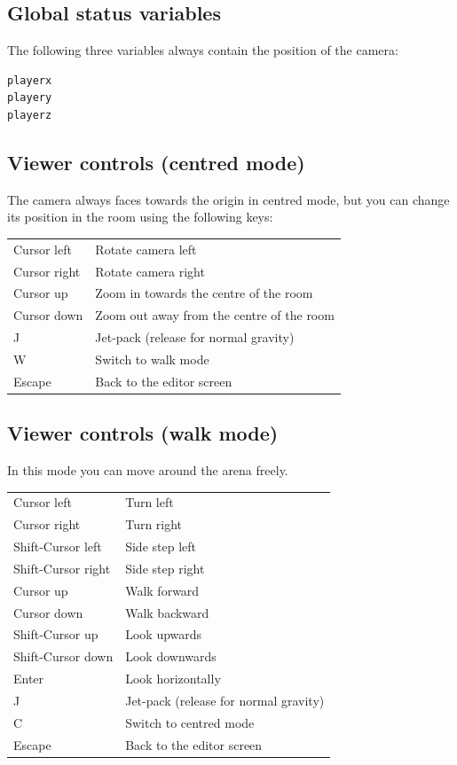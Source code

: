 \documentclass[12pt,a4paper,twoside]{article}
\renewcommand{\_}{\texttt{\symbol{95}}}
\begin{document}

\subsection{Global status variables}

The following three variables always contain the position of the camera:

\begin{verbatim}
playerx
playery
playerz
\end{verbatim}

\subsection{Viewer controls (centred mode)}

The camera always faces towards the origin in centred mode,
but you can change its position in the room using the following keys:

\begin{tabular}{ll}
Cursor left  & Rotate camera left\\
Cursor right & Rotate camera right\\
Cursor up    & Zoom in towards the centre of the room\\
Cursor down  & Zoom out away from the centre of the room\\
J            & Jet-pack (release for normal gravity)\\
W            & Switch to walk mode\\
Escape       & Back to the editor screen\\
\end{tabular}

\subsection{Viewer controls (walk mode)}

In this mode you can move around the arena freely.

\begin{tabular}{ll}
Cursor left  & Turn left\\
Cursor right & Turn right\\
Shift-Cursor left  & Side step left\\
Shift-Cursor right & Side step right\\
Cursor up    & Walk forward\\
Cursor down  & Walk backward\\
Shift-Cursor up & Look upwards\\
Shift-Cursor down & Look downwards\\
Enter        & Look horizontally\\
J            & Jet-pack (release for normal gravity)\\
C            & Switch to centred mode\\
Escape       & Back to the editor screen\\
\end{tabular}
\end{document}
